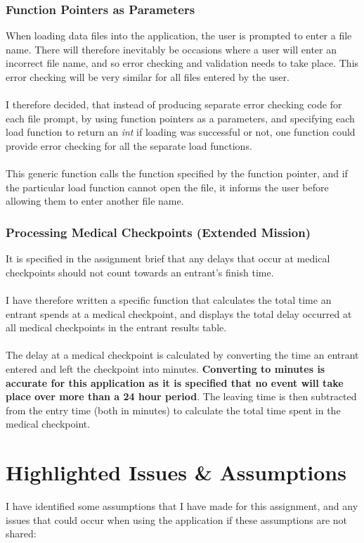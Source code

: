 \documentclass{article}
\begin{document}
\subsubsection{Function Pointers as Parameters}

When loading data files into the application, the user is prompted to enter a file name. There will therefore inevitably be occasions where a user will enter an incorrect file name, and so error checking and validation needs to take place. This error checking will be very similar for all files entered by the user.\\\\
I therefore decided, that instead of producing separate error checking code for each file prompt, by using function pointers as a parameters, and specifying each load function to return an \textit{int} if loading was successful or not, one function could provide error checking for all the separate load functions. \\\\
This generic function calls the function specified by the function pointer, and if the particular load function cannot open the file, it informs the user before allowing them to enter another file name.

\subsubsection{Processing Medical Checkpoints (Extended Mission)}

It is specified in the assignment brief that any delays that occur at medical checkpoints should not count towards an entrant's finish time.\\\\
I have therefore written a specific function that calculates the total time an entrant spends at a medical checkpoint, and displays the total delay occurred at all medical checkpoints in the entrant results table. \\\\
The delay at a medical checkpoint is calculated by converting the time an entrant entered and left the checkpoint into minutes. \textbf{Converting to minutes is accurate for this application as it is specified that no event will take place over more than a 24 hour period}. The leaving time is then subtracted from the entry time (both in minutes) to calculate the total time spent in the medical checkpoint. 

\section{Highlighted Issues \& Assumptions}
I have identified some assumptions that I have made for this assignment, and any issues that could occur when using the application if these assumptions are not shared:
\end{document}

